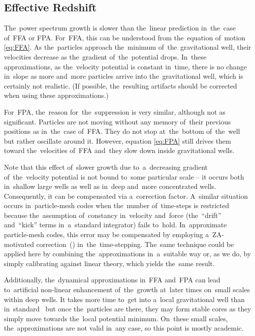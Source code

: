 \subsection{Effective Redshift}
\label{sec:z_eff}
The~power spectrum growth is slower than the~linear prediction in~the~case of~FFA or FPA. For~FFA, this can be understood from the~equation of~motion \eqref{eq:FFA}. As the~particles approach the~minimum of~the~gravitational well, their velocities decrease as the~gradient of~the~potential drops. In~these approximations, as the~velocity potential is constant in~time, there is no change in~slope as more and~more particles arrive into the~gravitational well, which is certainly not realistic. (If possible, the~resulting artifacts should be corrected when using these approximations.)

For~FPA, the~reason for~the~suppression is very similar, although not as significant. Particles are not moving without any memory of~their previous positions as in~the~case of~FFA. They do not stop at~the~bottom of~the~well but rather oscillate around it. However, equation \eqref{eq:FPA} still drives them toward the~velocities of~FFA and~they slow down inside gravitational wells.

Note that this effect of~slower growth due to~a~decreasing gradient of~the~velocity potential is not bound to~some particular scale -- it occurs both in~shallow large wells as well as in~deep and~more concentrated wells. Consequently, it can be compensated via a~correction factor. A~similar situation occurs in~particle-mesh codes when the~number of~time-steps is restricted because the~assumption of~constancy in~velocity and~force (the~``drift'' and~``kick'' terms in~a~standard integrator) fails to~hold. In~approximate particle-mesh codes, this error may be compensated by employing a~ZA-motivated correction~(\cite{Ref:Feng}) in~the~time-stepping. The~same technique could be applied here by combining the~approximations in~a~suitable way or, as we do, by simply calibrating against linear theory, which yields the~same result.

Additionally, the~dynamical approximations in~FFA and~FPA can lead to~artificial non-linear enhancement of~the~growth at~later times on~small scales within deep wells. It takes more time to~get into a~local gravitational well than in~standard \nbody\ but once the~particles are there, they may form stable cores as they simply move towards the~local potential minimum. On~these small scales, the~approximations are not valid in~any case, so this point is mostly academic.

